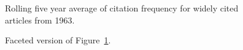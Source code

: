 \documentclass[
  10pt,
  letterpaper,
  DIV=11,
  numbers=noendperiod,
  twoside]{scrartcl}
\begin{document}
\begin{figure}


\caption{\label{fig-citation-spaghetti-1963}Rolling five year average of
citation frequency for widely cited articles from 1963.}

\end{figure}%

\begin{figure}


\caption{\label{fig-citation-facet-1963}Faceted version of
Figure~\ref{fig-citation-spaghetti-1963}.}

\end{figure}%
\end{document}
